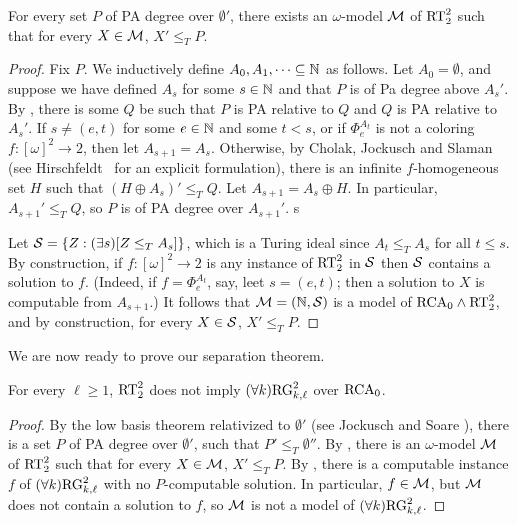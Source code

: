 \begin{lemma}\label{lem:model-rt22-jump-pa-zp}
For every set $P$ of PA degree over $\emptyset'$, there exists an $\omega$-model $\mathcal{M}$ of $\mathrm{RT}^{2}_{2}$ such that for every $X \in \mathcal{M}$, $X' \leq_T P$.
\end{lemma}
\begin{proof}
Fix $P$. We inductively define $A_0, A_1, \dots \subseteq \mathbb{N}$ as follows.
Let $A_0 = \emptyset$, and suppose we have defined $A_s$ for some $s \in \mathbb{N}$ and that $P$ is of Pa degree above $A_s'$. By , there is some $Q$ be such that $P$ is PA relative to $Q$ and $Q$ is PA relative to $A_s'$. 
If $s \neq (e,t)$ for some $e \in \mathbb{N}$ and some $t < s$, or if $\Phi_e^{A_t}$ is not a coloring $f: [\omega]^2 \to 2$, then let $A_{s+1} = A_s$. Otherwise, by Cholak, Jockusch and Slaman~\cite{Cholak2001strength} (see Hirschfeldt~\cite[Corollary 6.58]{Hirschfeldt2015Slicing} for an explicit formulation), there is an infinite $f$-homogeneous set $H$ such that $(H \oplus A_s)' \leq_T Q$. Let $A_{s+1} = A_s \oplus H$. In particular, $A_{s+1}' \leq_T Q$, so $P$ is of PA degree over $A_{s+1}'$. s

Let $\mathcal{S} = \{ Z: (\exists s)[Z \leq_T A_s]\}$, which is a Turing ideal since $A_t \leq_T A_s$ for all $t \leq s$. By construction, if $f: [\omega]^2 \to 2$ is any instance of $\mathrm{RT}^{2}_{2}$ in $\mathcal{S}$ then $\mathcal{S}$ contains a solution to $f$. (Indeed, if $f = \Phi_e^{A_t}$, say, leet $s = (e, t)$; then a solution to $X$ is computable from $A_{s+1}$.) It follows that $\mathcal{M} = (\mathbb{N}, \mathcal{S})$ is a model of $\mathrm{RCA}_0 \wedge \mathrm{RT}^{2}_{2}$, and by construction, for every $X \in \mathcal{S}$, $X' \leq_T P$. 
\end{proof}

We are now ready to prove our separation theorem.

\begin{theorem}
For every $\ell \geq 1$, $\mathrm{RT}^{2}_{2}$ does not imply $(\forall k)\mathrm{RG}^2_{k,\ell}$ over $\mathrm{RCA}_0$.
\end{theorem}
\begin{proof}
By the low basis theorem relativized to $\emptyset'$ (see Jockusch and Soare \cite[Theorem 2.1]{Jockusch197201}), there is a set $P$ of PA degree over $\emptyset'$, such that $P' \leq_T \emptyset''$. 
By , there is an $\omega$-model $\mathcal{M}$ of $\mathrm{RT}^{2}_{2}$ such that for every $X \in \mathcal{M}$, $X' \leq_T P$.
By , there is a computable instance $f$ of $(\forall k)\mathrm{RG}^2_{k, \ell}$ with no $P$-computable solution. In particular, $f \in \mathcal{M}$, but $\mathcal{M}$ does not contain a solution to $f$, so $\mathcal{M}$ is not a model of $(\forall k)\mathrm{RG}^2_{k, \ell}$.
\end{proof}

